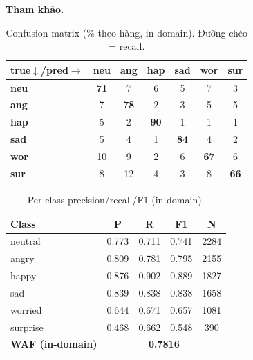 \documentclass[10pt]{article}
\begin{document}
\textbf{Tham khảo.}\ \cite{arevalo2017gmu}

\begin{table}[H]\centering\footnotesize\setlength{\tabcolsep}{4pt}
\begin{tabular}{lcccccc}
\toprule
\textbf{true$\downarrow$/pred$\rightarrow$} & \textbf{neu} & \textbf{ang} & \textbf{hap} & \textbf{sad} & \textbf{wor} & \textbf{sur} \\
\midrule
\textbf{neu} & \cellcolor{cmblue!50}\textbf{71} & \cellcolor{cmblue!5}7 & \cellcolor{cmblue!5}6 & \cellcolor{cmblue!3}5 & \cellcolor{cmblue!5}7 & \cellcolor{cmblue!2}3 \\
\textbf{ang} & \cellcolor{cmblue!5}7 & \cellcolor{cmblue!55}\textbf{78} & \cellcolor{cmblue!1}2 & \cellcolor{cmblue!2}3 & \cellcolor{cmblue!4}5 & \cellcolor{cmblue!3}5 \\
\textbf{hap} & \cellcolor{cmblue!4}5 & \cellcolor{cmblue!1}2 & \cellcolor{cmblue!63}\textbf{90} & \cellcolor{cmblue!0}1 & \cellcolor{cmblue!1}1 & \cellcolor{cmblue!1}1 \\
\textbf{sad} & \cellcolor{cmblue!4}5 & \cellcolor{cmblue!3}4 & \cellcolor{cmblue!1}1 & \cellcolor{cmblue!59}\textbf{84} & \cellcolor{cmblue!3}4 & \cellcolor{cmblue!1}2 \\
\textbf{wor} & \cellcolor{cmblue!7}10 & \cellcolor{cmblue!6}9 & \cellcolor{cmblue!1}2 & \cellcolor{cmblue!4}6 & \cellcolor{cmblue!47}\textbf{67} & \cellcolor{cmblue!4}6 \\
\textbf{sur} & \cellcolor{cmblue!6}8 & \cellcolor{cmblue!8}12 & \cellcolor{cmblue!3}4 & \cellcolor{cmblue!2}3 & \cellcolor{cmblue!5}8 & \cellcolor{cmblue!46}\textbf{66} \\
\bottomrule
\end{tabular}
\caption{Confusion matrix (\% theo hàng, in-domain). Đường chéo = recall.}
\end{table}

\begin{table}[H]\centering\footnotesize
\begin{tabular}{lcccc}
\toprule
\textbf{Class} & \textbf{P} & \textbf{R} & \textbf{F1} & \textbf{N} \\
\midrule
neutral & 0.773 & 0.711 & 0.741 & 2284 \\
angry & 0.809 & 0.781 & 0.795 & 2155 \\
happy & 0.876 & 0.902 & 0.889 & 1827 \\
sad & 0.839 & 0.838 & 0.838 & 1658 \\
worried & 0.644 & 0.671 & 0.657 & 1081 \\
surprise & 0.468 & 0.662 & 0.548 & 390 \\
\midrule
\textbf{WAF (in-domain)} & \multicolumn{4}{c}{\textbf{0.7816}} \\
\bottomrule
\end{tabular}
\caption{Per-class precision/recall/F1 (in-domain).}
\end{table}
\end{document}

